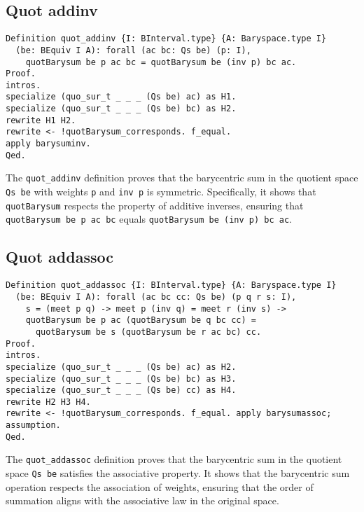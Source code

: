 \documentclass[a4paper,10pt]{article} %
\begin{document}
\subsection{Quot addinv}
\begin{lstlisting}
Definition quot_addinv {I: BInterval.type} {A: Baryspace.type I}
  (be: BEquiv I A): forall (ac bc: Qs be) (p: I),
    quotBarysum be p ac bc = quotBarysum be (inv p) bc ac.
Proof.
intros.
specialize (quo_sur_t _ _ _ (Qs be) ac) as H1.
specialize (quo_sur_t _ _ _ (Qs be) bc) as H2.
rewrite H1 H2. 
rewrite <- !quotBarysum_corresponds. f_equal. 
apply barysuminv.
Qed.
\end{lstlisting}
The \texttt{quot\_addinv} definition proves that the barycentric sum in the quotient space \texttt{Qs be} with weights \texttt{p} and \texttt{inv p} is symmetric. Specifically, it shows that \texttt{quotBarysum} respects the property of additive inverses, ensuring that \texttt{quotBarysum be p ac bc} equals \texttt{quotBarysum be (inv p) bc ac}.

\subsection{Quot addassoc}
\begin{lstlisting}
Definition quot_addassoc {I: BInterval.type} {A: Baryspace.type I} 
  (be: BEquiv I A): forall (ac bc cc: Qs be) (p q r s: I),
    s = (meet p q) -> meet p (inv q) = meet r (inv s) ->  
    quotBarysum be p ac (quotBarysum be q bc cc) = 
      quotBarysum be s (quotBarysum be r ac bc) cc.
Proof.
intros.
specialize (quo_sur_t _ _ _ (Qs be) ac) as H2.
specialize (quo_sur_t _ _ _ (Qs be) bc) as H3.
specialize (quo_sur_t _ _ _ (Qs be) cc) as H4.
rewrite H2 H3 H4. 
rewrite <- !quotBarysum_corresponds. f_equal. apply barysumassoc;
assumption.
Qed.
\end{lstlisting}
The \texttt{quot\_addassoc} definition proves that the barycentric sum in the quotient space \texttt{Qs be} satisfies the associative property. It shows that the barycentric sum operation respects the association of weights, ensuring that the order of summation aligns with the associative law in the original space.


\end{document}
